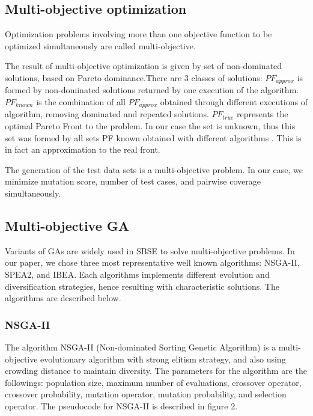 \documentclass[a4paper,12pt]{article}
\begin{document}
\subsection{Multi-objective optimization}

Optimization problems involving more than one objective function to be optimized simultaneously are called multi-objective. 

The result of multi-objective optimization is given by set of non-dominated solutions, based on Pareto dominance.There are 3 classes of solutions: $PF_{approx}$ is formed by non-dominated solutions returned by one execution of the algorithm. $PF_{known}$ is the combination of all $PF_{approx}$ obtained through different executions of algorithm, removing dominated and repeated solutions. $PF_{true}$ represents the optimal Pareto Front to the problem. In our case the set is unknown, thus this set was formed by all sets PF known obtained with different algorithms \cite{1197687}. This is in fact an approximation to the real front. 

The generation of the test data sets is a multi-objective problem. In our case, we minimize mutation score, number of test cases, and pairwise coverage simultaneously. 

\subsection{Multi-objective GA}

Variants of GAs are widely used in SBSE to solve multi-objective problems. In our paper, we chose three most representative well known algorithms: NSGA-II, SPEA2, and IBEA. Each algorithms implements different evolution and diversification strategies, hence resulting with characteristic solutions. The algorithms are described below.

\subsubsection{NSGA-II} 

The algorithm NSGA-II (Non-dominated Sorting Genetic Algorithm) \cite{996017} is a multi-objective evolutionary algorithm with strong elitism strategy, and also using crowding distance to maintain diversity. The parameters for the algorithm are the followings: population size, maximum number of evaluations, crossover operator, crossover probability, mutation operator, mutation probability, and selection operator.   
The pseudocode for NSGA-II is described in figure 2. 
\end{document}
